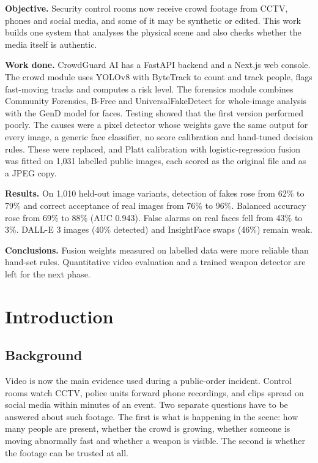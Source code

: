 \documentclass[12pt,a4paper,oneside]{report}
\begin{document}
\textbf{Objective.} Security control rooms now receive crowd footage from CCTV, phones and social media, and some of it may be synthetic or edited. This work builds one system that analyses the physical scene and also checks whether the media itself is authentic.

\textbf{Work done.} CrowdGuard AI has a FastAPI backend and a Next.js web console. The crowd module uses YOLOv8 with ByteTrack to count and track people, flags fast-moving tracks and computes a risk level. The forensics module combines Community Forensics, B-Free and UniversalFakeDetect for whole-image analysis with the GenD model for faces. Testing showed that the first version performed poorly. The causes were a pixel detector whose weights gave the same output for every image, a generic face classifier, no score calibration and hand-tuned decision rules. These were replaced, and Platt calibration with logistic-regression fusion was fitted on 1,031 labelled public images, each scored as the original file and as a JPEG copy.

\textbf{Results.} On 1,010 held-out image variants, detection of fakes rose from 62\% to 79\% and correct acceptance of real images from 76\% to 96\%. Balanced accuracy rose from 69\% to 88\% (AUC 0.943). False alarms on real faces fell from 43\% to 3\%. DALL-E 3 images (40\% detected) and InsightFace swaps (46\%) remain weak.

\textbf{Conclusions.} Fusion weights measured on labelled data were more reliable than hand-set rules. Quantitative video evaluation and a trained weapon detector are left for the next phase.

\clearpage
{}
\setcounter{page}{1}

\chapter{Introduction}

\section{Background}
Video is now the main evidence used during a public-order incident. Control rooms watch CCTV, police units forward phone recordings, and clips spread on social media within minutes of an event. Two separate questions have to be answered about such footage. The first is what is happening in the scene: how many people are present, whether the crowd is growing, whether someone is moving abnormally fast and whether a weapon is visible. The second is whether the footage can be trusted at all.
\end{document}
